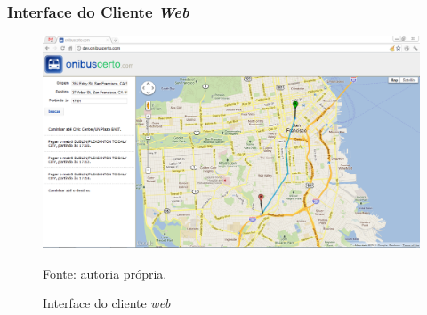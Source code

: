 \frame
{
\frametitle{Interface do Cliente \emph{Web}}
\begin{figure}
\includegraphics[width=1\textwidth]{./imgs/clienteweb.png}
\caption{Interface do cliente \emph{web}}
\tiny
Fonte: autoria própria.
\end{figure}
}
